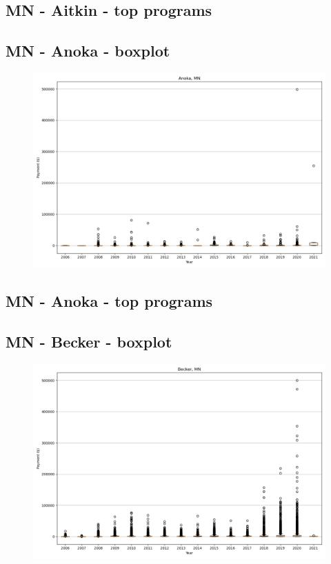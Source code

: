 \subsection*{MN - Aitkin - top programs}

\newpage
\subsection*{MN - Anoka - boxplot}
\begin{figure}[h]
\centering
\includegraphics[width=7in]{../output/boxplots/counties/Anoka-MN_boxplot.png}
\end{figure}


\subsection*{MN - Anoka - top programs}

\newpage
\subsection*{MN - Becker - boxplot}
\begin{figure}[h]
\centering
\includegraphics[width=7in]{../output/boxplots/counties/Becker-MN_boxplot.png}
\end{figure}


